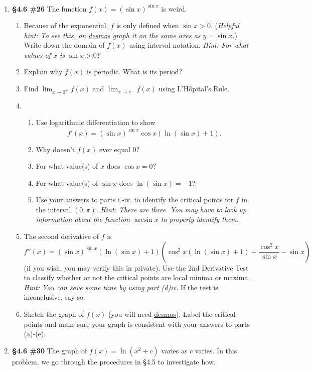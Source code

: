 \documentclass[%
]{article}
\begin{document}
\begin{enumerate}
	
\item {\bf \S4.6 \#26} The function $f(x)=(\sin x)^{\sin x}$ is weird.
	\begin{enumerate}
	\item Because of the exponential, $f$ is only defined when $\sin x> 0$.  (\textit{Helpful hint: To see this, on \url{desmos} graph it on the same axes as $y=\sin x$.})  Write down the domain of $f(x)$ using interval notation.  \textit{Hint: For what values of $x$ is $\sin x> 0$?}
	\item Explain why $f(x)$ is periodic.  What is its period?
	\item Find $\lim_{x\to 0^+}f(x)$ and $\lim_{x\to\pi^-}f(x)$ using L'H\^{o}pital's Rule.  
	\item \begin{enumerate}
		\item Use logarithmic differentiation to show 
		\[
		f'(x)=(\sin x)^{\sin x}\cos x\left(\ln(\sin x)+1\right).
		\]
		\item Why doesn't $f(x)$ ever equal 0?
		\item For what value(s) of $x$ does $\cos x=0$?
		\item For what value(s) of $\sin x$ does $\ln(\sin x)=-1$?
		\item Use your answers to parts i.-iv. to identify the critical points for $f$ in the interval $(0,\pi)$.  \textit{Hint: There are three.  You may have to look up information about the function $\arcsin x$ to properly identify them.}
		\end{enumerate}
	\item The second derivative of $f$ is
	\[
	f''(x)=(\sin x)^{\sin x}\left(\ln(\sin x)+1\right)  \left(\cos^2x\left(\ln(\sin x)+1\right) +\frac{\cos^2x}{\sin x}-\sin x\right)
	\]
	(if you wish, you may verify this in private).  Use the 2nd Derivative Test to classify whether or not the critical points are local minima or maxima.  \textit{Hint: You can save some time by using part (d)iv.}  If the test is inconclusive, say so.
	\item Sketch the graph of $f(x)$ (you will need \url{desmos}).  Label the critical points and make sure your graph is consistent with your answers to parts (a)-(e).
	\end{enumerate}

\item {\bf \S4.6 \#30} The graph of $f(x)=\ln(x^2+c)$ varies as $c$ varies.  In this problem, we go through the procedures in \S4.5 to investigate how.


\end{enumerate}
\end{document}

